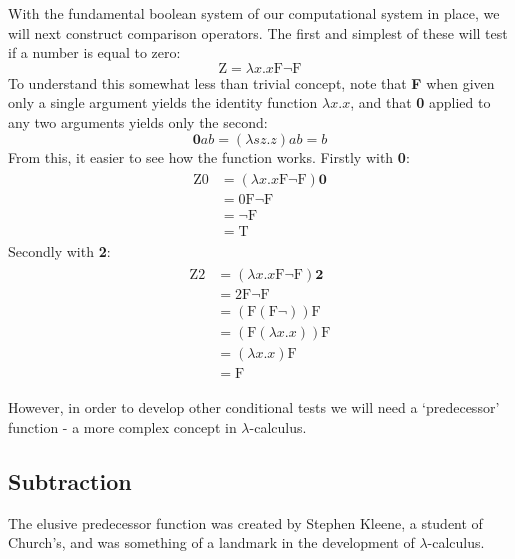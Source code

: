 \documentclass[Master.tex]{subfiles}
\begin{document}
With the fundamental boolean system of our computational system in place, we will next construct comparison operators. The first and simplest of these will test if a number is equal to zero:
\cite{rojas2015lambdatutorial}
\begin{equation*}
\bm{\mathrm{Z}} = \lambda x.x\bm{\mathrm{F\lnot F}}
\end{equation*}
To understand this somewhat less than trivial concept, note that \textbf{F} when given only a single argument yields the identity function $\lambda x.x$, and that \textbf{0} applied to any two arguments yields only the second:
\cite{rojas2015lambdatutorial}
\begin{equation*}
\bm{0}ab = (\lambda sz.z)ab = b
\end{equation*}
From this, it easier to see how the function works. Firstly with \textbf{0}:
\cite{rojas2015lambdatutorial}
\begin{gather*}
\begin{aligned}
\bm{\mathrm{Z0}} &= (\lambda x.x\bm{\mathrm{F\lnot F}})\bm{0}\\
&= \bm{\mathrm{0F\lnot F}}\\
&= \bm{\mathrm{\lnot F}}\\
&= \bm{\mathrm{T}}
\end{aligned}
\end{gather*}
Secondly with \textbf{2}:
\begin{gather*}
\begin{aligned}
\bm{\mathrm{Z2}} &= (\lambda x.x\bm{\mathrm{F\lnot F}})\bm{2}\\
&= \bm{\mathrm{2F\lnot F}}\\
&= (\bm{\mathrm{F}}(\bm{\mathrm{F}}\lnot)) \bm{\mathrm{F}}\\
&= (\bm{\mathrm{F}}(\lambda x.x))\bm{\mathrm{F}}\\
&= (\lambda x.x)\bm{\mathrm{F}}\\
&= \bm{\mathrm{F}} 
\end{aligned}
\end{gather*}

However, in order to develop other conditional tests we will need a `predecessor' function - a more complex concept in $\lambda$-calculus.
\subsection{Subtraction}

The elusive predecessor function was created by Stephen Kleene, a student of Church's, and was something of a landmark in the development of $\lambda$-calculus.
\end{document}
